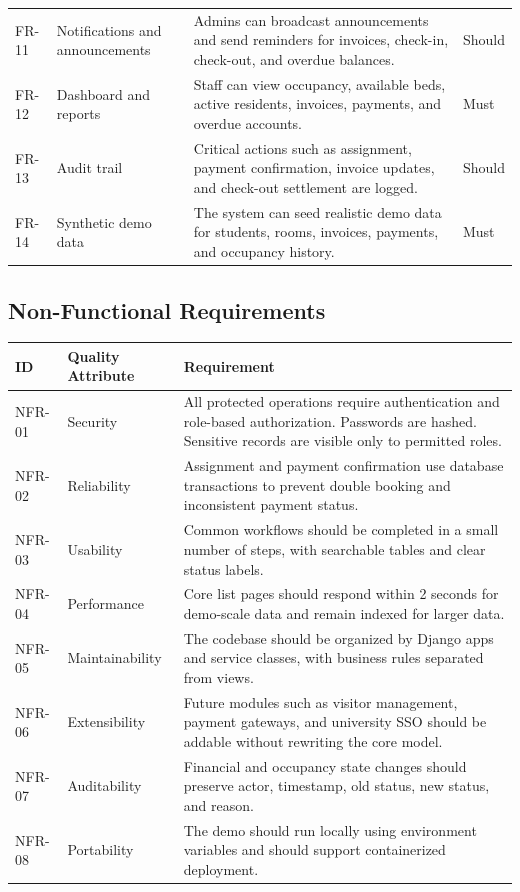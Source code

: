 \documentclass[11pt,a4paper]{article}
\begin{document}
\begin{longtable}{L{0.11\textwidth} L{0.19\textwidth} L{0.45\textwidth} L{0.10\textwidth}}
FR-11 & Notifications and announcements & Admins can broadcast announcements and send reminders for invoices, check-in, check-out, and overdue balances. & Should\\
FR-12 & Dashboard and reports & Staff can view occupancy, available beds, active residents, invoices, payments, and overdue accounts. & Must\\
FR-13 & Audit trail & Critical actions such as assignment, payment confirmation, invoice updates, and check-out settlement are logged. & Should\\
FR-14 & Synthetic demo data & The system can seed realistic demo data for students, rooms, invoices, payments, and occupancy history. & Must\\
\bottomrule
\end{longtable}

\subsection{Non-Functional Requirements}

\begin{longtable}{L{0.14\textwidth} L{0.20\textwidth} L{0.52\textwidth}}
\toprule
\textbf{ID} & \textbf{Quality Attribute} & \textbf{Requirement}\\
\midrule
\endhead
NFR-01 & Security & All protected operations require authentication and role-based authorization. Passwords are hashed. Sensitive records are visible only to permitted roles.\\
NFR-02 & Reliability & Assignment and payment confirmation use database transactions to prevent double booking and inconsistent payment status.\\
NFR-03 & Usability & Common workflows should be completed in a small number of steps, with searchable tables and clear status labels.\\
NFR-04 & Performance & Core list pages should respond within 2 seconds for demo-scale data and remain indexed for larger data.\\
NFR-05 & Maintainability & The codebase should be organized by Django apps and service classes, with business rules separated from views.\\
NFR-06 & Extensibility & Future modules such as visitor management, payment gateways, and university SSO should be addable without rewriting the core model.\\
NFR-07 & Auditability & Financial and occupancy state changes should preserve actor, timestamp, old status, new status, and reason.\\
NFR-08 & Portability & The demo should run locally using environment variables and should support containerized deployment.\\
\bottomrule
\end{longtable}
\end{document}
